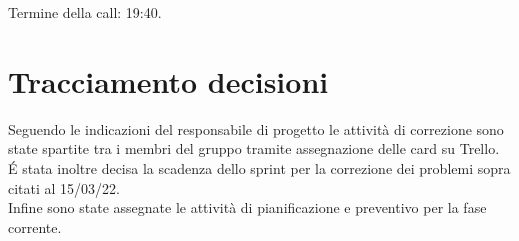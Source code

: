 \noindent Termine della call: 19:40.

\section{Tracciamento decisioni}
Seguendo le indicazioni del responsabile di progetto le attività di correzione sono state spartite tra i membri del gruppo tramite assegnazione delle card su Trello.\\
\'E stata inoltre decisa la scadenza dello sprint per la correzione dei problemi sopra citati al 15/03/22.\\
Infine sono state assegnate le attività di pianificazione e preventivo per la fase corrente.
